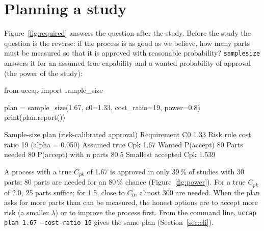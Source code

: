 \documentclass[a4paper,11pt,oneside,openany,parskip=half-,headings=standardclasses,toc=flat,numbers=noenddot]{scrbook}
\newcommand{\code}[1]{\texttt{\begingroup\def\_{\textunderscore\allowbreak}#1\endgroup}}
\newcommand{\secref}[1]{Section~\ref{#1}}
\newcommand{\figref}[1]{Figure~\ref{#1}}
\begin{document}
\section{Planning a study}\label{sec:plan}

\figref{fig:required} answers the question after the study. Before the study the question is the reverse: if
the process is as good as we believe, how many parts must be measured so that it is approved with reasonable
probability? \code{sample\_size} answers it for an assumed true capability and a wanted probability of
approval (the power of the study):

\begin{pycode}
from uccap import sample_size

plan = sample_size(1.67, c0=1.33, cost_ratio=19, power=0.8)
print(plan.report())
\end{pycode}

\begin{outbox}
Sample-size plan (risk-calibrated approval)
            Requirement C0  1.33
                 Risk rule  cost ratio 19 (alpha = 0.050)
          Assumed true Cpk  1.67
          Wanted P(accept)  80%
              Parts needed  80
    P(accept) with n parts  80.5%
     Smallest accepted Cpk  1.539
\end{outbox}

A process with a true $C_{pk}$ of 1.67 is approved in only 39\,\% of studies with 30 parts; 80 parts are
needed for an 80\,\% chance (\figref{fig:power}). For a true $C_{pk}$ of 2.0, 25 parts suffice; for 1.5, close
to $C_0$, almost 300 are needed. When the plan asks for more parts than can be measured, the honest options are
to accept more risk (a smaller $\lambda$) or to improve the process first. From the command line,
\code{uccap plan 1.67 --cost-ratio 19} gives the same plan (\secref{sec:cli}).
\end{document}
